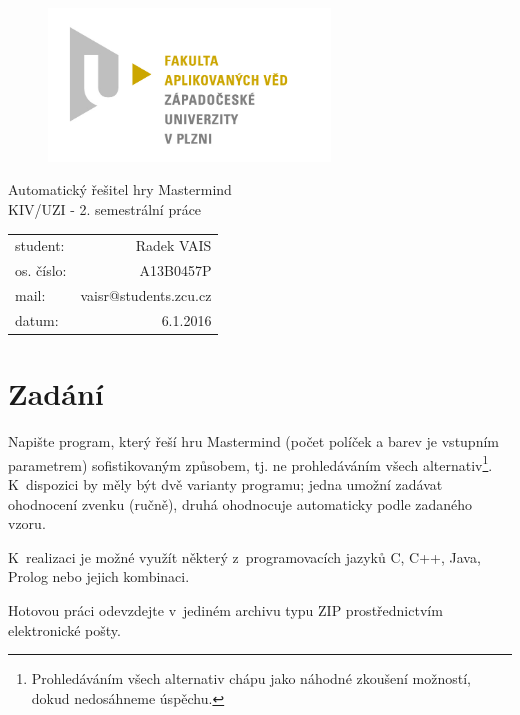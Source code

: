 \documentclass[12pt, a4paper]{article}
\begin{document}
\begin{figure}[h!]
\centering
\includegraphics[bb= 0 0 820 445 , width=75mm]{favlogo.jpg}
\end{figure}

\vspace{5cm}

{\centering
{\huge Automatický řešitel hry Mastermind}\\[1em]
{\large KIV/UZI - 2. semestrální práce}\\[7,5cm]
}

\begin{tabular}{l r}
student: & Radek VAIS\\
os. číslo: & A13B0457P\\
mail: & vaisr@students.zcu.cz\\
datum: & 6.1.2016\\
\end{tabular}

\thispagestyle{empty}
\newpage

\section{Zadání} %

Napište program, který řeší hru Mastermind (počet políček a barev je vstupním parametrem) sofistikovaným způsobem,
 tj. ne prohledáváním všech alternativ\footnote{Prohledáváním všech alternativ chápu jako náhodné zkoušení možností, dokud nedosáhneme úspěchu.}. K~dispozici  by  měly být dvě varianty programu; jedna umožní zadávat ohodnocení 
zvenku (ručně), druhá ohodnocuje automaticky podle zadaného vzoru.  

K~realizaci je možné využít některý z~programovacích jazyků C, C++, Java, Prolog nebo jejich kombinaci. 

Hotovou práci odevzdejte v~jediném archivu typu ZIP prostřednictvím elektronické pošty.
\end{document}
